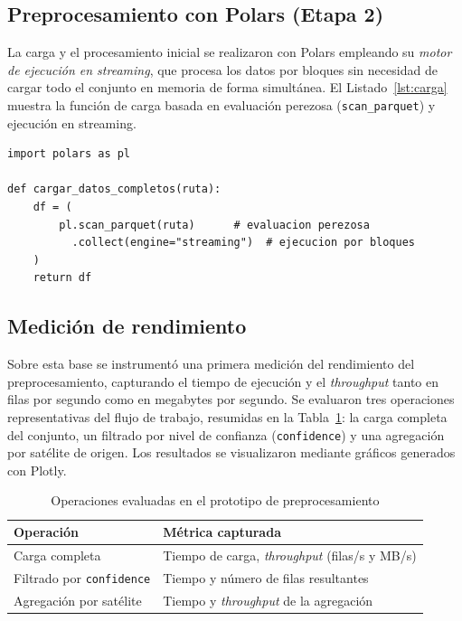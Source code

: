 \subsection{Preprocesamiento con Polars (Etapa 2)}
La carga y el procesamiento inicial se realizaron con Polars empleando su \textit{motor de ejecución en streaming}, que procesa los datos por bloques sin necesidad de cargar todo el conjunto en memoria de forma simultánea. El Listado~\ref{lst:carga} muestra la función de carga basada en evaluación perezosa (\texttt{scan\_parquet}) y ejecución en streaming.

\begin{lstlisting}[style=py, caption={Carga en streaming del dataset consolidado con Polars.}, label={lst:carga}]
import polars as pl

def cargar_datos_completos(ruta):
    df = (
        pl.scan_parquet(ruta)      # evaluacion perezosa
          .collect(engine="streaming")  # ejecucion por bloques
    )
    return df
\end{lstlisting}

\subsection{Medición de rendimiento}
Sobre esta base se instrumentó una primera medición del rendimiento del preprocesamiento, capturando el tiempo de ejecución y el \textit{throughput} tanto en filas por segundo como en megabytes por segundo. Se evaluaron tres operaciones representativas del flujo de trabajo, resumidas en la Tabla~\ref{tab:proto}: la carga completa del conjunto, un filtrado por nivel de confianza (\texttt{confidence}) y una agregación por satélite de origen. Los resultados se visualizaron mediante gráficos generados con Plotly.

\begin{table}[t]
\caption{Operaciones evaluadas en el prototipo de preprocesamiento}
\label{tab:proto}
\centering
\renewcommand{\arraystretch}{1.3}
\begin{tabular}{p{2.7cm} p{4.8cm}}
\toprule
\textbf{Operación} & \textbf{Métrica capturada} \\
\midrule
Carga completa & Tiempo de carga, \textit{throughput} (filas/s y MB/s) \\
Filtrado por \texttt{confidence} & Tiempo y número de filas resultantes \\
Agregación por satélite & Tiempo y \textit{throughput} de la agregación \\
\bottomrule
\end{tabular}
\end{table}

